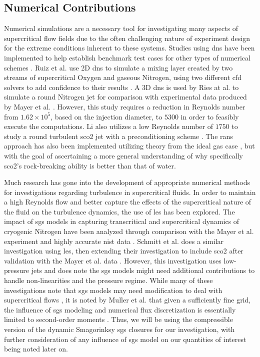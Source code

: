 \subsection{Numerical Contributions}
Numerical simulations are a necessary tool for investigating many aspects of supercritical flow fields due to the often challenging nature of experiment design for the extreme conditions inherent to these systems. Studies using \gls{dns} have been implemented to help establish benchmark test cases for other types of numerical schemes \cite{OVAIS2022, SENGUPTA2019}. Ruiz et al. use 2D \gls{dns} to simulate a mixing layer created by two streams of supercritical Oxygen and gaseous Nitrogen, using two different \gls{cfd} solvers to add confidence to their results \cite{article}. A 3D \gls{dns} is used by Ries at al. to simulate a round Nitrogen jet for comparison with experimental data produced by Mayer et al. \cite{DNS_N}. However, this study requires a reduction in Reynolds number from $1.62 \times 10^5$, based on the injection diameter, to $5300$ in order to feasibly execute the computations. Li also utilizes a low Reynolds number of $1750$ to study a round turbulent \gls{sco2} jet with a preconditioning scheme \cite{Li2012}. The \gls{rans} approach has also been implemented utilizing theory from the ideal gas case \cite{RANS}, but with the goal of ascertaining a more general understanding of why specifically \gls{sco2}'s rock-breaking ability is better than that of water. 

Much research has gone into the development of appropriate numerical methods for investigations regarding turbulence in supercritical fluids. In order to maintain a high Reynolds flow and better capture the effects of the supercritical nature of the fluid on the turbulence dynamics, the use of \gls{les} has been explored. The impact of \gls{sgs} models in capturing transcritical and supercritical dynamics of cryogenic Nitrogen have been analyzed through comparison with the Mayer et al. experiment and highly accurate \gls{nist} data \cite{PETIT201361, doi:10.1080/00102200500287613, doi:10.1063/1.1795011, doi:10.1063/1.4937948, Same_LES}. Schmitt et al. does a similar investigation using \gls{les}, then extending their investigation to include \gls{sco2} after validation with the Mayer et al. data \cite{LES_N}. However, this investigation uses low-pressure jets and does note the \gls{sgs} models might need additional contributions to handle non-linearities and the pressure regime. While many of these investigations note that \gls{sgs} models may need modification to deal with supercritical flows \cite{LES_N, PETIT201361, doi:10.1063/1.4937948, doi:10.1080/00102200500287613}, it is noted by Muller et al. that given a sufficiently fine grid, the influence of \gls{sgs} modeling and numerical flux discretization is essentially limited to second-order moments \cite{doi:10.1063/1.4937948}. Thus, we will be using the compressible version of the dynamic Smagorinksy \gls{sgs} closures for our investigation, with further consideration of any influence of \gls{sgs} model on our quantities of interest being noted later on. 

